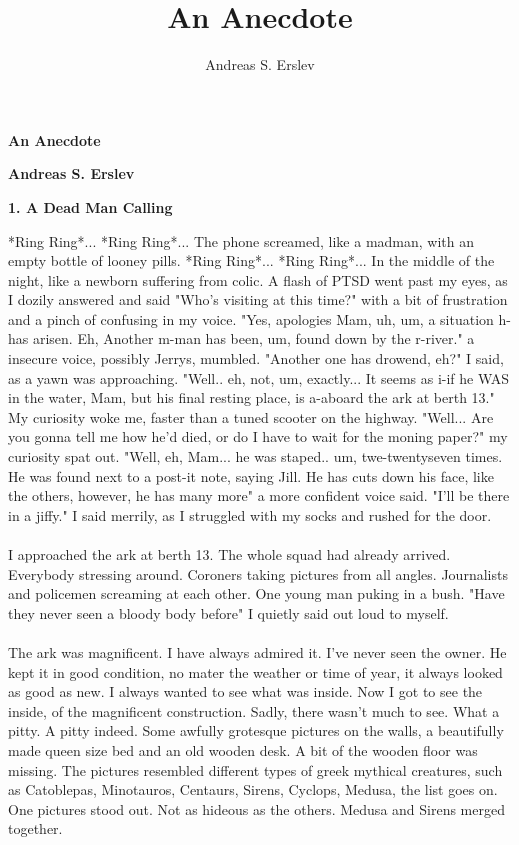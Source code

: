 \documentclass[]{article}
\title{An Anecdote}
\author{Andreas S. Erslev}
\begin{document}
\begin{center}
	\Large\textbf{An Anecdote}
\end{center}

\begin{center}
	\large\textbf{Andreas S. Erslev}
\end{center}

\begin{center}
	\large\textbf{1. A Dead Man Calling}
\end{center}

*Ring Ring*... *Ring Ring*... The phone screamed, like a madman, with an empty bottle of looney pills. *Ring Ring*... *Ring Ring*... In the middle of the night, like a newborn suffering from colic. A flash of PTSD went past my eyes, as I dozily answered and said "Who's visiting at this time?" with a bit of frustration and a pinch of confusing in my voice. "Yes, apologies Mam, uh, um, a situation h-has arisen. Eh, Another m-man has been, um, found down by the r-river." a insecure voice, possibly Jerrys, mumbled. "Another one has drowend, eh?" I said, as a yawn was approaching. "Well.. eh, not, um, exactly... It seems as i-if he WAS in the water, Mam, but his final resting place, is a-aboard the ark at berth 13." My curiosity woke me, faster than a tuned scooter on the highway. "Well... Are you gonna tell me how he'd died, or do I have to wait for the moning paper?" my curiosity spat out. "Well, eh, Mam... he was staped.. um, twe-twentyseven times. He was found next to a post-it note, saying Jill. He has cuts down his face, like the others, however, he has many more" a more confident voice said. "I'll be there in a jiffy." I said merrily, as I struggled with my socks and rushed for the door.
\\ \\
I approached the ark at berth 13. The whole squad had already arrived. Everybody stressing around. Coroners taking pictures from all angles. Journalists and policemen screaming at each other. One young man puking in a bush. "Have they never seen a bloody body before" I quietly said out loud to myself. 
\\ \\
The ark was magnificent. I have always admired it. I've never seen the owner. He kept it in good condition, no mater the weather or time of year, it always looked as good as new. I always wanted to see what was inside. Now I got to see the inside, of the magnificent construction. Sadly, there wasn't much to see. What a pitty. A pitty indeed. Some awfully grotesque pictures on the walls, a beautifully made queen size bed and an old wooden desk. A bit of the wooden floor was missing. The pictures resembled different types of greek mythical creatures, such as Catoblepas, Minotauros, Centaurs, Sirens, Cyclops, Medusa, the list goes on. One pictures stood out. Not as hideous as the others. Medusa and Sirens merged together.
\end{document}
